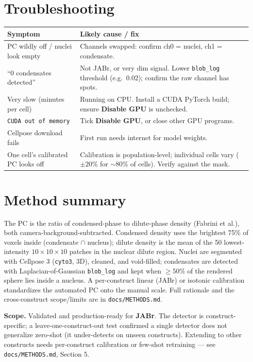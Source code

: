 \documentclass[11pt]{article}
\newcommand{\code}[1]{\texttt{\small #1}}
\begin{document}
\section{Troubleshooting}
\begin{longtable}{>{\raggedright}p{5.5cm} p{8.0cm}}
\toprule
\textbf{Symptom} & \textbf{Likely cause / fix}\\
\midrule
\endhead
PC wildly off / nuclei look empty & Channels swapped: confirm ch0 = nuclei, ch1 = condensate.\\
``0 condensates detected'' & Not JABr, or very dim signal. Lower \code{blob\_log} threshold (e.g.\ 0.02); confirm the raw channel has spots.\\
Very slow (minutes per cell) & Running on CPU. Install a CUDA PyTorch build; ensure \textbf{Disable GPU} is unchecked.\\
\code{CUDA out of memory} & Tick \textbf{Disable GPU}, or close other GPU programs.\\
Cellpose download fails & First run needs internet for model weights.\\
One cell's calibrated PC looks off & Calibration is population-level; individual cells vary ($\pm 20\%$ for $\sim$80\% of cells). Verify against the mask.\\
\bottomrule
\end{longtable}

\section{Method summary}
The PC is the ratio of condensed-phase to dilute-phase density (Fabrini et al.),
both camera-background-subtracted. Condensed density uses the brightest 75\% of
voxels inside (condensate $\cap$ nucleus); dilute density is the mean of the 50
lowest-intensity $10{\times}10{\times}10$ patches in the nuclear dilute region.
Nuclei are segmented with Cellpose 3 (\code{cyto3}, 3D), cleaned, and void-filled;
condensates are detected with Laplacian-of-Gaussian \code{blob\_log} and kept when
$\geq 50\%$ of the rendered sphere lies inside a nucleus. A per-construct linear
(JABr) or isotonic calibration standardizes the automated PC onto the manual
scale. Full rationale and the cross-construct scope/limits are in
\code{docs/METHODS.md}.

\vspace{1em}
\noindent\textbf{Scope.} Validated and production-ready for \textbf{JABr}. The
detector is construct-specific; a leave-one-construct-out test confirmed a single
detector does not generalize zero-shot (it under-detects on unseen constructs).
Extending to other constructs needs per-construct calibration or few-shot
retraining --- see \code{docs/METHODS.md}, Section 5.
\end{document}

